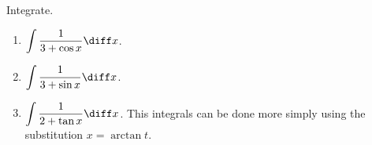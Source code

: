 Integrate.
\begin{enumerate}
\item \label{problemInt1/(3+cos x)dx} $\displaystyle \int \frac{1}{3+\cos x}\diff x$.

\item $\displaystyle \int \frac{1}{3+\sin x}\diff x$.
\item $\displaystyle \int \frac{1}{2+\tan x}\diff x$. This integrals can be done more simply using the substitution $x=\arctan t$.
\end{enumerate}